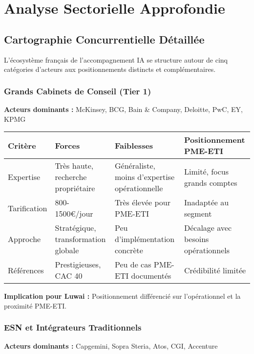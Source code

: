\chapter{Analyse Sectorielle Approfondie}
\label{app:analyse}

\section{Cartographie Concurrentielle Détaillée}

L'écosystème français de l'accompagnement IA se structure autour de cinq catégories d'acteurs aux positionnements distincts et complémentaires.

\subsection{Grands Cabinets de Conseil (Tier 1)}

\textbf{Acteurs dominants :} McKinsey, BCG, Bain \& Company, Deloitte, PwC, EY, KPMG

\begin{longtable}{@{}p{3cm}p{4cm}p{4cm}p{4cm}@{}}
\toprule
\textbf{Critère} & \textbf{Forces} & \textbf{Faiblesses} & \textbf{Positionnement PME-ETI} \\
\midrule
Expertise & Très haute, recherche propriétaire & Généraliste, moins d'expertise opérationnelle & Limité, focus grands comptes \\
Tarification & 800-1500€/jour & Très élevée pour PME-ETI & Inadaptée au segment \\
Approche & Stratégique, transformation globale & Peu d'implémentation concrète & Décalage avec besoins opérationnels \\
Références & Prestigieuses, CAC 40 & Peu de cas PME-ETI documentés & Crédibilité limitée \\
\bottomrule
\end{longtable}

\textbf{Implication pour Luwai :} Positionnement différencié sur l'opérationnel et la proximité PME-ETI.

\subsection{ESN et Intégrateurs Traditionnels}

\textbf{Acteurs dominants :} Capgemini, Sopra Steria, Atos, CGI, Accenture

